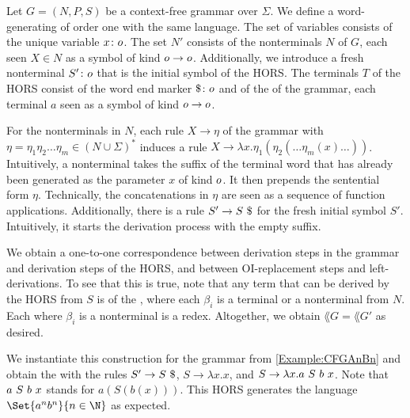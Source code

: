 \documentclass[../../diss.tex]{subfiles}
\begin{document}
\begin{example}%
\label{Example:HORSfromCFG}%
    Let $G = (N,P,S)$ be a context-free grammar over $\Sigma$.
    We define a word-generating  of order one with the same language.
    The set of variables consists of the unique variable $x \colon o$.
    The set $N'$ consists of the nonterminals $N$ of $G$, each seen $X \in N$ as a symbol of kind $o \to o$.
    Additionally, we introduce a fresh nonterminal $S' \colon o$ that is the initial symbol of the HORS.\@
    The terminals $T$ of the HORS consist of the word end marker $\$ \colon o$ and of the  of the grammar, each terminal $a$ seen as a symbol of kind $o \to o$.

    For the nonterminals in $N$, each rule $X \to \eta$ of the grammar with $\eta = \eta_1 \eta_2 \ldots \eta_m \in {(N \cup \Sigma)}^*$ induces a rule $X \to \lambda x . \eta_1 (\eta_2 ( \ldots \eta_m (x) \ldots )) $.
    Intuitively, a nonterminal takes the suffix of the terminal word that has already been generated as the parameter $x$ of kind $o$.
    It then prepends the sentential form $\eta$.
    Technically, the concatenations in $\eta$ are seen as a sequence of function applications.
%
    Additionally, there is a rule $S' \to S \appl \wordend$ for the fresh initial symbol $S'$.
    Intuitively, it starts the derivation process with the empty suffix.

    We obtain a one-to-one correspondence between derivation steps in the grammar and derivation steps of the HORS, and between OI-replacement steps and left-derivations.
    To see that this is true, note that any term that can be derived by the HORS from $S$ is of the , where each $\beta_i$ is a terminal or a nonterminal from $N$.
    Each  where $\beta_i$ is a nonterminal is a redex.
%
%
    Altogether, we obtain $\lang{G} = \lang{G'}$ as desired.

    We instantiate this construction for the grammar from \cref{Example:CFGAnBn} and obtain the  with the rules $S' \to S \appl \wordend$, $S \to \lambda x . x$, and $S \to \lambda x . a \  S \  b \  x$.
    Note that $a \  S \  b \  x$ stands for $a(S(b(x)))$.
    This HORS generates the language $\Set{a^n b^n}{n \in \N}$ as expected.
\end{example}
\end{document}
